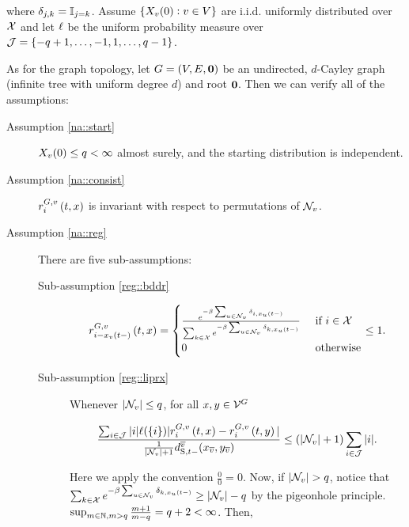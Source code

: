 where \(\delta_{j,k} = \mathbb{I}_{j=k}\). Assume \(\{X_{v}(0): v \in V\}\) are i.i.d. uniformly distributed over \(\mathcal{X}\) and let \(\ell\) be the uniform probability measure over \(\mathcal{J} = \{-q+1,\dots,-1,1,\dots,q-1\}\). 

\ind As for the graph topology, let \(G = (V,E, \mathbf{0})\) be an undirected, \(d\)-Cayley graph (infinite tree with uniform degree \(d\)) and root \(\mathbf{0}\). Then we can verify all of the assumptions:

\begin{description}
\item[Assumption \ref{na::start}] \(X_{v}(0) \leq q < \infty\) almost surely, and the starting distribution is independent.

\item[Assumption \ref{na::consist}] \(\rate\gvpara{G}{v}\stpara{i}\tmepro{t}{\xf}{}\) is invariant with respect to permutations of \(\mathcal{N}_{v}\).

\item[Assumption \ref{na::reg}]

There are five sub-assumptions:

\begin{description}
\item[Sub-assumption \ref{reg::bddr}] 

\[\rate\gvpara{G}{v}\stpara{i-\xf\vind{v}\tme{t-}}\tmepro{t}{\xf}{} = \begin{cases}
\frac{e^{-\beta\sum_{u\in\neigh{v}} \delta_{i,\xf_u\tme{t-}}}}{\sum_{k \in \sta} e^{-\beta\sum_{u\in\neigh{v}} \delta_{k,\xf_u\tme{t-}}}} &\te{ if } i \in \sta\\
0 &\te{ otherwise}
\end{cases} \leq 1.\]

\item[Sub-assumption \ref{reg::liprx}] 

Whenever \(|\mathcal{N}_{v}| \leq q\), for all \(x,y\in\mathcal{V}^{G}\)

\[\frac{\sum_{i\in\jmps}|i|\Sm(\{i\})|\rate\gvpara{G}{v}\stpara{i}\tmepro{t}{\xf}{} - \rate\gvpara{G}{v}\stpara{i}\tmepro{t}{\xg}{}|}{\frac{1}{|\neigh{v}|+1}\stmet{t-}^{\cl{v}}(\xf\vind{\cl{v}},\xg\vind{\cl{v}})}\leq (|\neigh{v}|+1)\sum_{i\in\jmps}|i|.\]

Here we apply the convention \(\frac{0}{0} = 0\). Now, if \(|\mathcal{N}_{v}| > q\), notice that \(\sum_{k\in\mathcal{X}}e^{-\beta\sum_{u\in\mathcal{N}_{v}}\delta_{k,x_{u}(t-)}}\geq |\mathcal{N}_{v}| - q\) by the pigeonhole principle. \(\sup_{m\in\mathbb{N},m > q}\frac{m+1}{m-q} = q+2 < \infty\). Then,


\end{description}
\end{description}
